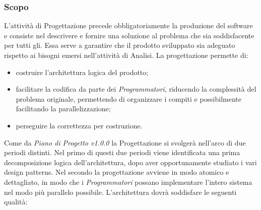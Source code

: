 \subsubsection{Scopo}
L'attività di Progettazione precede obbligatoriamente la produzione del software e consiste nel descrivere e fornire una soluzione al problema che sia soddisfacente per tutti gli. Essa serve a garantire che il prodotto sviluppato sia adeguato rispetto ai bisogni emersi nell'attività di Analisi. 
La progettazione permette di:
\begin{itemize}
	\item costruire l'architettura logica del prodotto;
	\item facilitare la codifica da parte dei \textit{Programmatori}, riducendo la complessità del problema originale, permettendo di organizzare i compiti e possibilmente facilitando la parallelizzazione;
	\item perseguire la correttezza per costruzione.
\end{itemize}
Come da \textit{Piano di Progetto v1.0.0} la Progettazione si svolgerà nell'arco di due periodi distinti. 
Nel primo di questi due periodi viene identificata una prima decomposizione logica dell'architettura, dopo aver opportunamente studiato i vari design patterns. Nel secondo la progettazione avviene in modo atomico e dettagliato, in modo che i \textit{Programmatori} possano implementare l'intero sistema nel modo più parallelo possibile. 
L'architettura dovrà soddisfare le seguenti qualità: 
